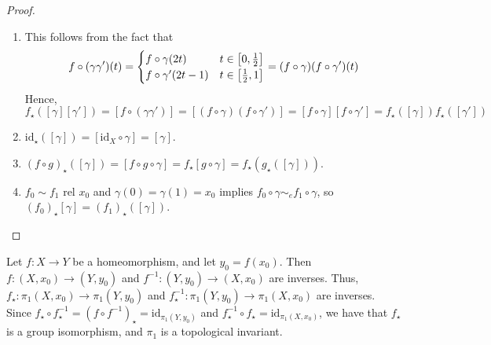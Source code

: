 \begin{proof}
	\begin{enumerate}
		\item This follows from the fact that
			\[ f \circ (\gamma\gamma')(t) = \begin{cases}
				f \circ \gamma(2t) & t \in \qty[0,\frac 12] \\
				f \circ \gamma'(2t-1) & t \in \qty[\frac 12, 1]
			\end{cases} = (f \circ \gamma)(f \circ \gamma')(t) \]
			Hence,
			\[ f_\star([\gamma][\gamma']) = [f\circ(\gamma\gamma')] = [(f\circ \gamma)(f \circ \gamma')] = [f \circ \gamma][f \circ \gamma'] = f_\star([\gamma]) f_\star([\gamma']) \]
		\item \( \mathrm{id}_\star([\gamma]) = [\mathrm{id}_X\circ \gamma] = [\gamma] \).
		\item \( (f \circ g)_\star([\gamma]) = [f \circ g \circ \gamma] = f_\star[g \circ \gamma] = f_\star(g_\star([\gamma])) \).
		\item \( f_0 \sim f_1 \text{ rel } x_0 \) and \( \gamma(0) = \gamma(1) = x_0 \) implies \( f_0 \circ \gamma \sim_e f_1 \circ \gamma \), so \( (f_0)_\star[\gamma] = (f_1)_\star([\gamma]) \).
	\end{enumerate}
\end{proof}
\begin{example}
	Let \( f \colon X \to Y \) be a homeomorphism, and let \( y_0 = f(x_0) \).
	Then \( f \colon (X, x_0) \to (Y, y_0) \) and \( f^{-1} \colon (Y, y_0) \to (X, x_0) \) are inverses.
	Thus, \( f_\star \colon \pi_1(X, x_0) \to \pi_1(Y, y_0) \) and \( f^{-1}_\star \colon \pi_1(Y, y_0) \to \pi_1(X, x_0) \) are inverses.
	Since \( f_\star \circ f^{-1}_\star = (f \circ f^{-1})_\star = \mathrm{id}_{\pi_1(Y,y_0)} \) and \( f^{-1}_\star \circ f_\star = \mathrm{id}_{\pi_1(X,x_0)} \), we have that \( f_\star \) is a group isomorphism, and \( \pi_1 \) is a topological invariant.
\end{example}

